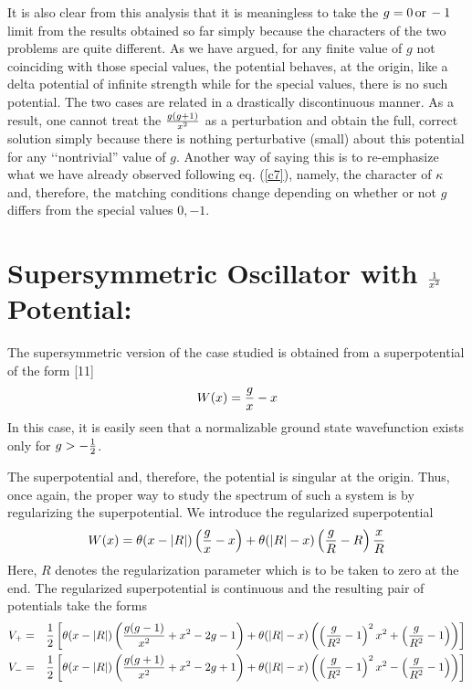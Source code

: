 \documentclass[a4paper,11pt]{article}
\begin{document}
It is also clear from this analysis that it is meaningless to take the
$g=0\,{\rm or}\,-1$ limit from the results obtained so far simply
because  the characters
of the two problems are quite different. As we have argued, for any
finite value of $g$ not coinciding with those special values, the
potential behaves, at the origin, like a delta potential of infinite
strength while for the special values, there is no such potential. The
two cases are related in a drastically discontinuous manner. As a
result, one cannot treat the ${g(g+1)\over x^{2}}$ as a perturbation
and obtain the full, correct solution simply because there is nothing
perturbative (small) about this potential for any \lq\lq nontrivial''
value of $g$. Another way of saying this is to re-emphasize what we
have already observed following eq. (\ref{c7}), namely, the character
of $\kappa$ and, therefore, the matching conditions change depending
on whether or not $g$ differs from the special values $0,-1$.

\section{Supersymmetric Oscillator with ${1\over x^{2}}$ Potential:}
The supersymmetric version of the
case studied is obtained from a superpotential of
the form [11]
\begin{equation}
W(x) = {g\over x} - x\label{d1}
\end{equation}
In this case, it is easily seen that a normalizable ground state
wavefunction exists only for $g>-{1\over 2}$.

The superpotential and, therefore, the potential is singular at the
origin. Thus, once again, the proper way to study the spectrum of such
a system is by regularizing the superpotential. We introduce the
regularized superpotential
\begin{equation}
W(x) = \theta(x-|R|)\left({g\over x} - x\right) +
\theta(|R|-x)\left({g\over R}-R\right){x\over R}\label{d2}
\end{equation}
Here, $R$ denotes the regularization parameter which is to be taken to
zero at the end. The regularized superpotential is continuous and the
resulting pair of potentials take the forms
\begin{eqnarray*}
V_{+} & = & {1\over 2}\left[\theta(x-|R|)\left({g(g-1)\over
x^{2}}+x^{2}-2g-1\right) + \theta(|R|-x)\left(\left({g\over
R^{2}}-1\right)^{2}x^{2}+\left({g\over
R^{2}}-1\right)\right)\right]\nonumber\\
V_{-} & = & {1\over 2}\left[\theta(x-|R|)\left({g(g+1)\over
x^{2}}+x^{2}-2g+1\right) + \theta(|R|-x)\left(\left({g\over
R^{2}}-1\right)^{2}x^{2} - \left({g\over
R^{2}}-1\right)\right)\right]\label{d3}
\end{eqnarray*}
\end{document}
